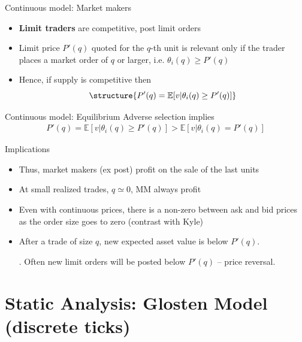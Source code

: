 \documentclass[english,10pt
,aspectratio=169
]{beamer}
\begin{document}
\begin{frame}{Continuous model: Market makers}
	\begin{itemize}	
		\item \textbf{Limit traders} are competitive, post limit orders
		\item Limit price $P'(q)$ quoted for the $q$-th unit is relevant only if the trader places a market order of $q$ or larger, i.e. $\theta_i(q) \geq P'(q)$
		\item Hence, if supply is competitive then
		\[
		\structure{P'(q) = \mathbb{E}[v|\theta_i(q) \geq P'(q)]}
		\]
	\end{itemize}
\end{frame}


\begin{frame}{Continuous model: Equilibrium}
	Adverse selection implies
	\begin{align}
	P'(q) = \mathbb{E}[v|\theta_i(q) \geq P'(q)] > \mathbb{E}[v|\theta_i(q) = P'(q)]
	\end{align}
	\pause
	\begin{block}{Implications}
		\begin{itemize}
			\item Thus, market makers (ex post) profit on the sale of the last units
			\item At small realized trades, $q \simeq 0$, MM always profit
			\item Even with continuous prices, there is a non-zero  between ask and bid prices as the order size goes to zero (contrast with Kyle)
			\item After a trade of size $q$, new expected asset value is below $P'(q)$. \pause 
			
			. Often new limit orders will be posted below $P'(q)$ -- price reversal.
		\end{itemize}
	\end{block}
\end{frame}


\section{Static Analysis: Glosten Model (discrete ticks)}
\end{document}
